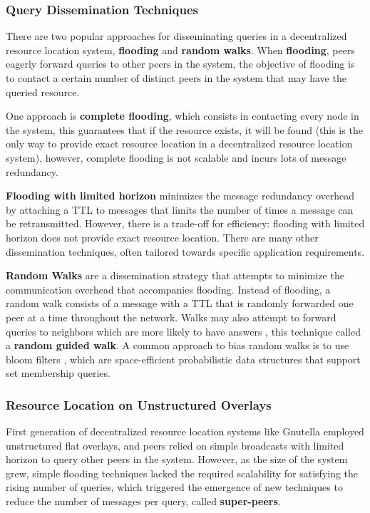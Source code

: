 \subsubsection{Query Dissemination Techniques}

There are two popular approaches for disseminating queries in a decentralized resource location system, \textbf{flooding} and \textbf{random walks}. When \textbf{flooding}, peers eagerly forward queries to other peers in the system, the objective of flooding is to contact a certain number of distinct peers in the system that may have the queried resource.

One approach is \textbf{complete flooding}, which consists in contacting every node in the system, this guarantees that if the resource exists, it will be found (this is the only way to provide exact resource location in a decentralized resource location system), however, complete flooding is not scalable and incurs lots of message redundancy. 

\textbf{Flooding with limited horizon} minimizes the message redundancy overhead by attaching a TTL to messages that limits the number of times a message can be retransmitted. However, there is a trade-off for efficiency: flooding with limited horizon does not provide exact resource location. There are many other dissemination techniques, often tailored towards specific application requirements.

\textbf{Random Walks} are a dissemination strategy that attempts to minimize the communication overhead that accompanies flooding. Instead of flooding, a random walk consists of a message with a TTL that is randomly forwarded one peer at a time throughout the network. Walks may also attempt to forward queries to neighbors which are more likely to have answers \cite{1022239}, this technique called a \textbf{random guided walk}. A common approach to bias random walks is to use bloom filters \cite{5751342}, which are space-efficient probabilistic data structures that support set membership queries.

\subsubsection{Resource Location on Unstructured Overlays}

First generation of decentralized resource location systems like Gnutella \cite{gnutella_gtk} employed unstructured flat overlays, and peers relied on simple broadcasts with limited horizon to query other peers in the system. However, as the size of the system grew, simple flooding techniques lacked the required scalability for satisfying the rising number of queries, which triggered the emergence of new techniques to reduce the number of messages per query, called \textbf{super-peers}. 

